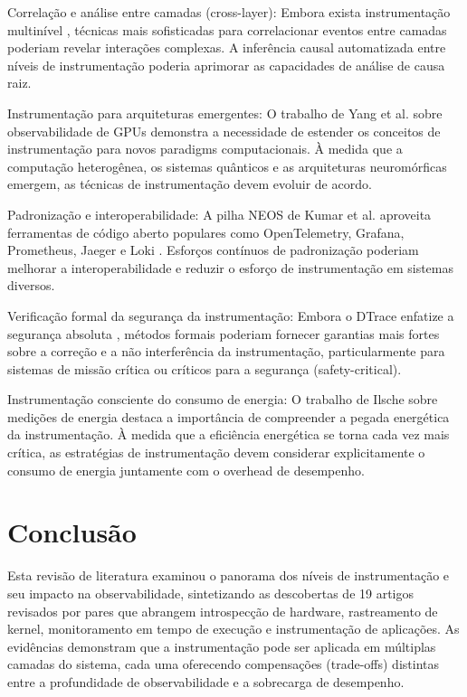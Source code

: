 \documentclass[sigconf, anonymous]{acmart}
\begin{document}
Correlação e análise entre camadas (cross-layer): Embora exista instrumentação multinível \cite{ghanta_2017, brown_2003}, técnicas mais sofisticadas para correlacionar eventos entre camadas poderiam revelar interações complexas. A inferência causal automatizada entre níveis de instrumentação poderia aprimorar as capacidades de análise de causa raiz.

Instrumentação para arquiteturas emergentes: O trabalho de Yang et al. sobre observabilidade de GPUs \cite{yang_2025} demonstra a necessidade de estender os conceitos de instrumentação para novos paradigms computacionais. À medida que a computação heterogênea, os sistemas quânticos e as arquiteturas neuromórficas emergem, as técnicas de instrumentação devem evoluir de acordo.

Padronização e interoperabilidade: A pilha NEOS de Kumar et al. aproveita ferramentas de código aberto populares como OpenTelemetry, Grafana, Prometheus, Jaeger e Loki \cite{kumar_2023}. Esforços contínuos de padronização poderiam melhorar a interoperabilidade e reduzir o esforço de instrumentação em sistemas diversos.

Verificação formal da segurança da instrumentação: Embora o DTrace enfatize a segurança absoluta \cite{cantrill_2004}, métodos formais poderiam fornecer garantias mais fortes sobre a correção e a não interferência da instrumentação, particularmente para sistemas de missão crítica ou críticos para a segurança (safety-critical).

Instrumentação consciente do consumo de energia: O trabalho de Ilsche sobre medições de energia \cite{ilsche_2020} destaca a importância de compreender a pegada energética da instrumentação. À medida que a eficiência energética se torna cada vez mais crítica, as estratégias de instrumentação devem considerar explicitamente o consumo de energia juntamente com o overhead de desempenho.

\section{Conclusão}
Esta revisão de literatura examinou o panorama dos níveis de instrumentação e seu impacto na observabilidade, sintetizando as descobertas de 19 artigos revisados por pares que abrangem introspecção de hardware, rastreamento de kernel, monitoramento em tempo de execução e instrumentação de aplicações. As evidências demonstram que a instrumentação pode ser aplicada em múltiplas camadas do sistema, cada uma oferecendo compensações (trade-offs) distintas entre a profundidade de observabilidade e a sobrecarga de desempenho.
\end{document}

